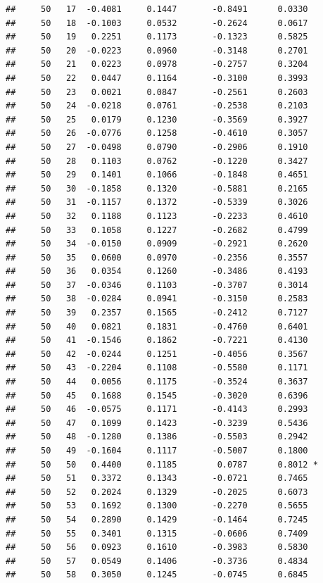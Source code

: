\documentclass[
]{article}
\begin{document}
\begin{verbatim}
##     50   17  -0.4081     0.1447       -0.8491      0.0330  
##     50   18  -0.1003     0.0532       -0.2624      0.0617  
##     50   19   0.2251     0.1173       -0.1323      0.5825  
##     50   20  -0.0223     0.0960       -0.3148      0.2701  
##     50   21   0.0223     0.0978       -0.2757      0.3204  
##     50   22   0.0447     0.1164       -0.3100      0.3993  
##     50   23   0.0021     0.0847       -0.2561      0.2603  
##     50   24  -0.0218     0.0761       -0.2538      0.2103  
##     50   25   0.0179     0.1230       -0.3569      0.3927  
##     50   26  -0.0776     0.1258       -0.4610      0.3057  
##     50   27  -0.0498     0.0790       -0.2906      0.1910  
##     50   28   0.1103     0.0762       -0.1220      0.3427  
##     50   29   0.1401     0.1066       -0.1848      0.4651  
##     50   30  -0.1858     0.1320       -0.5881      0.2165  
##     50   31  -0.1157     0.1372       -0.5339      0.3026  
##     50   32   0.1188     0.1123       -0.2233      0.4610  
##     50   33   0.1058     0.1227       -0.2682      0.4799  
##     50   34  -0.0150     0.0909       -0.2921      0.2620  
##     50   35   0.0600     0.0970       -0.2356      0.3557  
##     50   36   0.0354     0.1260       -0.3486      0.4193  
##     50   37  -0.0346     0.1103       -0.3707      0.3014  
##     50   38  -0.0284     0.0941       -0.3150      0.2583  
##     50   39   0.2357     0.1565       -0.2412      0.7127  
##     50   40   0.0821     0.1831       -0.4760      0.6401  
##     50   41  -0.1546     0.1862       -0.7221      0.4130  
##     50   42  -0.0244     0.1251       -0.4056      0.3567  
##     50   43  -0.2204     0.1108       -0.5580      0.1171  
##     50   44   0.0056     0.1175       -0.3524      0.3637  
##     50   45   0.1688     0.1545       -0.3020      0.6396  
##     50   46  -0.0575     0.1171       -0.4143      0.2993  
##     50   47   0.1099     0.1423       -0.3239      0.5436  
##     50   48  -0.1280     0.1386       -0.5503      0.2942  
##     50   49  -0.1604     0.1117       -0.5007      0.1800  
##     50   50   0.4400     0.1185        0.0787      0.8012 *
##     50   51   0.3372     0.1343       -0.0721      0.7465  
##     50   52   0.2024     0.1329       -0.2025      0.6073  
##     50   53   0.1692     0.1300       -0.2270      0.5655  
##     50   54   0.2890     0.1429       -0.1464      0.7245  
##     50   55   0.3401     0.1315       -0.0606      0.7409  
##     50   56   0.0923     0.1610       -0.3983      0.5830  
##     50   57   0.0549     0.1406       -0.3736      0.4834  
##     50   58   0.3050     0.1245       -0.0745      0.6845  

\end{verbatim}
\end{document}
